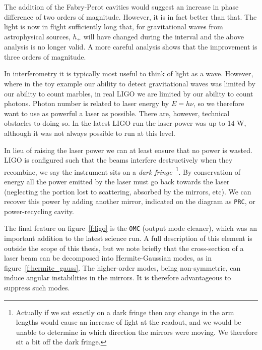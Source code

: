 The addition of the Fabry-Perot cavities would suggest an increase in
phase difference of two orders of magnitude.  However, it is in fact
better than that.  The light is now in flight sufficiently long that,
for gravitational waves from astrophysical sources, $h_+$ will have
changed during the interval and the above analysis is no longer
valid.  A more careful analysis shows that the improvement is 
three orders of magnitude.

In interferometry it is typically most useful to think of light as a
wave.  However, where in the toy example our ability to detect
gravitational waves was limited by our ability to count marbles, in
real LIGO we are limited by our ability to count photons.  Photon
number is related to laser energy by $E=h\nu$, so we therefore want to
use as powerful a laser as possible.  There are, however, technical
obstacles to doing so.  In the latest LIGO run the laser power was up
to 14 W, although it was not always possible to run at this level.

In lieu of raising the laser power we can at least ensure that no
power is wasted.  LIGO is configured such that the beams interfere
destructively when they recombine, we say the instrument sits on a
\emph{dark fringe}~\footnote{Actually if we sat exactly on a dark
fringe then any change in the arm lengths would cause an increase of
light at the readout, and we would be unable to determine in which
direction the mirrors were moving.  We therefore sit a bit off the
dark fringe.}.  By conservation of energy all the power emitted by the
laser must go back towards the laser (neglecting the portion lost to
scattering, absorbed by the mirrors, etc).  We can recover this power
by adding another mirror, indicated on the diagram as \texttt{PRC}, or
power-recycling cavity.

The final feature on figure~\ref{f:ligo} is the \texttt{OMC} (output
mode cleaner), which was an important addition to the latest science
run.  A full description of this element is outside the scope of this
thesis, but we note briefly that the cross-section of a laser beam can
be decomposed into Hermite-Gaussian modes, as in
figure~\ref{f:hermite_gauss}.  The higher-order modes, being
non-symmetric, can induce angular instabilities in the mirrors.  It is
therefore advantageous to suppress such modes.

